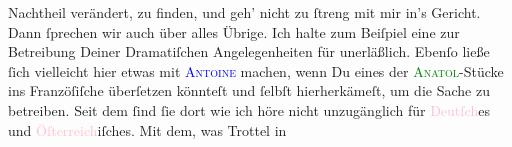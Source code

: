                Nachtheil verändert, zu finden, und geh’ nicht zu ſtreng mit mir in’s Gericht.\pend
           \pstart
           Dann ſprechen wir auch über alles Übrige. Ich halte zum Beiſpiel eine \label{K_L02711-3v}\label{K_L02711-3h} zur Betreibung
               Deiner Dramatiſchen Angelegenheiten für unerläßlich. Ebenſo ließe ſich vielleicht
               hier etwas mit \textsc{\textcolor{blue}{Antoine}{}\ledrightnote{\textcolor{blue}{André Antoine}}} machen, wenn Du eines der \textsc{\textcolor{green}{Anatol}{}\ledrightnote{\textcolor{green}{Anatol}}}-Stücke ins Franzöſiſche überſetzen könnteſt und ſelbſt hierherkämeſt, um die
               Sache zu betreiben. Seit dem \label{K_L02711-4v}\label{K_L02711-4h} ſind ſie dort wie ich höre nicht unzugänglich { }{\pb}für \textcolor{pink}{Deutſch}{}\ledrightnote{\textcolor{pink}{Deutschland}}es
               und \textcolor{pink}{Öſterreich}{}\ledrightnote{\textcolor{pink}{Österreich}}iſches. Mit dem, was Trottel in
